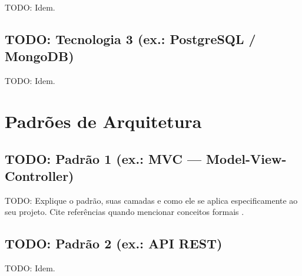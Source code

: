 TODO: Idem.


\subsection{TODO: Tecnologia 3 (ex.: PostgreSQL / MongoDB)}
\label{subsec:tech-banco}

TODO: Idem.




\section{Padrões de Arquitetura}
\label{sec:padroes}


\subsection{TODO: Padrão 1 (ex.: MVC — Model-View-Controller)}
\label{subsec:padrao-mvc}

TODO: Explique o padrão, suas camadas e como ele se aplica especificamente
ao seu projeto. Cite referências quando mencionar conceitos formais
\cite{pressman2016}.


\subsection{TODO: Padrão 2 (ex.: API REST)}
\label{subsec:padrao-rest}

TODO: Idem.


